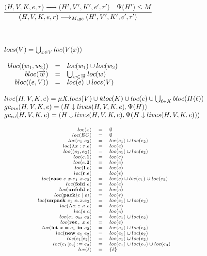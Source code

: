\documentclass[fleqn]{article}
\begin{document}
\[\begin{array}{l}
\infer{(H,V,K,e,r) \longrightarrow_{M,gc} (H',V',K',e',r')}{(H,V,K,e,r) \longrightarrow (H',V',K',e',r') & \Psi(H') \le M} \\
\\
\\
\\
locs(V) = \bigcup_{x\in V} loc(V(x)) \\
\\
\begin{array}{rcl}
bloc((w_1,w_2)) & = & loc(w_1) \cup loc(w_2) \\
bloc(\overrightarrow{w}) & = & \bigcup_{w \in \overrightarrow{w}} loc(w) \\
bloc((e,V)) & = & loc(e) \cup locs(V)
\end{array} \\
\\
live(H,V,K,e) = \mu X. locs(V) \cup kloc(K) \cup loc(e) \cup \bigcup_{\ell \in X} bloc(H(\ell))  \\
gc_{ms}(H,V,K,e) = (H \downarrow lives(H,V,K,e), \Psi(H)) \\
gc_{co}(H,V,K,e) = (H \downarrow lives(H,V,K,e), \Psi(H \downarrow lives(H,V,K,e)))
\end{array}
\]

\[
\scriptsize
\begin{array}{rcl}
loc(x) & = & \emptyset \\
loc(EC) & = & \emptyset \\
loc(e_1~e_2) & = & loc(e_1) \cup loc(e_2) \\
loc(\lambda x : \tau. e) & = & loc(e) \\
loc((e_1,e_2)) & = & loc(e_1) \cup loc(e_2) \\
loc(e.\mathbf{1}) & = & loc(e) \\
loc(e.\mathbf{2}) & = & loc(e) \\
loc(\mathbf{l}.e) & = & loc(e) \\
loc(\mathbf{r}.e) & = & loc(e) \\
loc(\mathbf{case}~e~x.e_1~x.e_2) & = & loc(e) \cup loc(e_1) \cup loc(e_2) \\
loc(\mathbf{fold}~e) & = & loc(e) \\
loc(\mathbf{unfold}~e) & = & loc(e) \\
loc(\mathbf{pack} \langle c \mid e \rangle) & = & loc(e) \\
loc(\mathbf{unpack}~e_1~\alpha.x.e_2) & = & loc(e_1) \cup loc(e_2) \\
loc(\Lambda \alpha :: \kappa. e) & = & loc(e) \\
loc(e~c) & = & loc(e) \\
loc(e_1~o_{bt}~e_2) & = & loc(e_1) \cup loc(e_2) \\
loc(\mathbf{rec}_{\tau}~x.e) & = & loc(e) \\
loc(\mathbf{let}~x=e_1~\mathbf{in}~e_2) & = & loc(e_1) \cup loc(e_2) \\
loc(\mathbf{new}~e_1~e_2) & = & loc(e_1) \cup loc(e_2) \\
loc(e_1[e_2]) & = & loc(e_1) \cup loc(e_2) \\
loc(e_1[e_2] := e_3) & = & loc(e_1) \cup loc(e_2) \cup loc(e_3) \\
loc(\ell) & = & \{ \ell \}
\end{array}
\]
\end{document}
